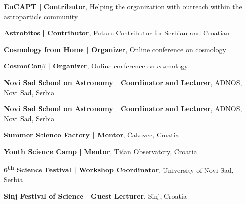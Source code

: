 

\begin{scholarship}

            {\href{https://www.eucapt.org}{\textbf{EuCAPT | Contributor}}, Helping the organization with outreach within the astroparticle community}

    
            {\href{https://astrobites.org}{\textbf{Astrobites | Contributor}}, Future Contributor for Serbian and Croatian}

            {\href{https://www.cosmhttps://astrobites.org/ologyfromhome.com}{\textbf{Cosmology from Home | Organizer}}, Online conference on cosmology}
            
            
            {\href{https://www.cosmologyfromhome.com/cosmoconbeta/}{\textbf{CosmoCon$\beta$ | Organizer}}, Online conference on cosmology}
                    
                    
					
	                {\textbf{Novi Sad School on Astronomy | Coordinator and Lecturer}, ADNOS, Novi Sad, Serbia}
	                
	                {\textbf{Novi Sad School on Astronomy | Coordinator and Lecturer}, ADNOS, Novi Sad, Serbia}	                

					{\textbf{Summer Science Factory | Mentor}, Čakovec, Croatia}
					

					{\textbf{Youth Science Camp | Mentor}, Tičan Observatory, Croatia}
					

					{\textbf{6\textsuperscript{th} Science Festival | Workshop Coordinator}, University of Novi Sad, Serbia}
					

					{\textbf{Sinj Festival of Science | Guest Lecturer},  Sinj, Croatia}	
					

\end{scholarship}
